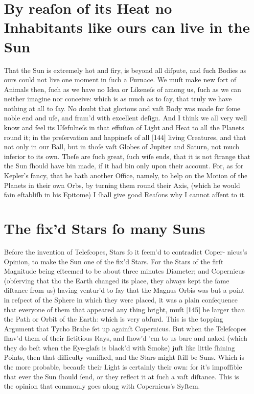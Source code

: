 \documentclass[letterpaper]{book}
\begin{document}
\section{By reaſon of its Heat no Inhabitants like ours can live in the Sun}

That the Sun is extremely hot and firy, is beyond all diſpute, and ſuch
Bodies as ours could not live one moment in ſuch a Furnace. We muſt make new
ſort of Animals then, ſuch as we have no Idea or Likeneſs of among us, ſuch
as we can neither imagine nor conceive: which is as much as to ſay, that
truly we have nothing at all to ſay. No doubt that glorious and vaſt Body
was made for ſome noble end and uſe, and fram'd with excellent deſign.  And I
think we all very well know and feel its Uſefulneſs in that effuſion of
Light and Heat to all the Planets round it; in the preſervation and
happineſs of all [144] living Creatures, and that not only in our Ball, but
in thoſe vaſt Globes of Jupiter and Saturn, not much inferior to its own.
Theſe are ſuch great, ſuch wiſe ends, that it is not ſtrange that the Sun
ſhould have bin made, if it had bin only upon their account. For, as for
Kepler's fancy, that he hath another Office, namely, to help on the Motion
of the Planets in their own Orbs, by turning them round their Axis, (which
he would fain eſtabliſh in his Epitome) I ſhall give good Reaſons why I
cannot aſſent to it.


\section{The fix'd Stars ſo many Suns}

Before the invention of Teleſcopes, Stars ſo it ſeem'd to contradict Coper-
nicus's Opinion, to make the Sun one of the fix'd Stars. For the Stars of
the firſt Magnitude being eſteemed to be about three minutes Diameter; and
Copernicus (obſerving that tho the Earth changed its place, they always kept
the ſame diſtance from us) having ventur'd to ſay that the Magnus Orbis was
but a point in reſpect of the Sphere in which they were placed, it was a
plain conſequence that everyone of them that appeared any thing bright, muſt
[145] be larger than the Path or Orbit of the Earth: which is very abſurd.
This is the topping Argument that Tycho Brahe ſet up againſt Copernicus. But
when the Teleſcopes ſhav'd them of their fictitious Rays, and ſhow'd 'em to
us bare and naked (which they do beſt when the Eye-glaſs is black'd with
Smoke) juſt like little ſhining Points, then that difficulty vaniſhed, and
the Stars might ſtill be Suns. Which is the more probable, becauſe their
Light is certainly their own: for it's impoſſible that ever the Sun ſhould
ſend, or they reflect it at ſuch a vaſt diſtance. This is the opinion that
commonly goes along with Copernicus's Syſtem.
\end{document}

